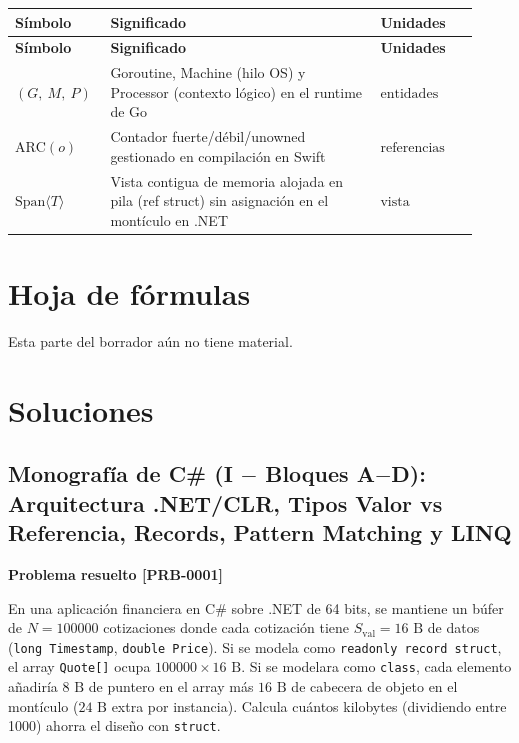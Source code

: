 \documentclass{book}
\begin{document}
\begingroup
\setlength{\LTpre}{0pt}
\setlength{\LTpost}{0pt}
\begin{longtable}{@{}>{\centering\arraybackslash}p{0.17\linewidth}>{\raggedright\arraybackslash}p{0.55\linewidth}>{\raggedright\arraybackslash}p{0.2\linewidth}@{}}
\textbf{Símbolo} & \textbf{Significado} & \textbf{Unidades} \\
\hline
\endfirsthead
\textbf{Símbolo} & \textbf{Significado} & \textbf{Unidades} \\
\hline
\endhead
$\left( G, \  M, \  P\right)$ & Goroutine, Machine (hilo OS) y Processor (contexto lógico) en el runtime de Go & $\mathrm{entidades}$ \\
$\text{ARC}(o)$ & Contador fuerte/débil/unowned gestionado en compilación en Swift & $\mathrm{referencias}$ \\
$\text{Span}\langle T \rangle$ & Vista contigua de memoria alojada en pila (ref struct) sin asignación en el montículo en .NET & $\mathrm{vista}$ \\
\end{longtable}
\endgroup
\chapter{Hoja de fórmulas}

\noindent Esta parte del borrador aún no tiene material.
\chapter{Soluciones}

\section{Monografía de C\# (I \(-\) Bloques A\(-\)D): Arquitectura .NET/CLR, Tipos Valor vs Referencia, Records, Pattern Matching y LINQ}

\noindent\textbf{Problema resuelto [PRB-0001]}

En una aplicación financiera en C\# sobre .NET de 64 bits, se mantiene un búfer de \(N = 100000\) cotizaciones donde cada cotización tiene \(S_{\text{val}} = 16\text{ B}\) de datos (\texttt{long Timestamp}, \texttt{double Price}). Si se modela como \texttt{readonly record struct}, el array \texttt{Quote[]} ocupa \(100000 \times 16\text{ B}\). Si se modelara como \texttt{class}, cada elemento añadiría \(8\text{ B}\) de puntero en el array más \(16\text{ B}\) de cabecera de objeto en el montículo (\(24\text{ B}\) extra por instancia). Calcula cuántos kilobytes (dividiendo entre 1000) ahorra el diseño con \texttt{struct}.
\end{document}
